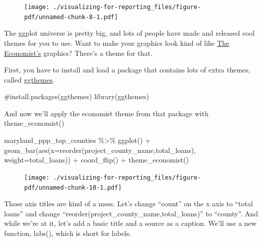 \documentclass[
  letterpaper,
  DIV=11,
  numbers=noendperiod]{scrreprt}
\newenvironment{Shaded}{\begin{snugshade}}{\end{snugshade}}
\newcommand{\AttributeTok}[1]{\textcolor[rgb]{0.40,0.45,0.13}{#1}}
\newcommand{\CommentTok}[1]{\textcolor[rgb]{0.37,0.37,0.37}{#1}}
\newcommand{\FunctionTok}[1]{\textcolor[rgb]{0.28,0.35,0.67}{#1}}
\newcommand{\NormalTok}[1]{\textcolor[rgb]{0.00,0.23,0.31}{#1}}
\newcommand{\SpecialCharTok}[1]{\textcolor[rgb]{0.37,0.37,0.37}{#1}}
\begin{document}
\begin{figure}[H]

{\centering \texttt{[image: ./visualizing-for-reporting\_files/figure-pdf/unnamed-chunk-8-1.pdf]}

}

\end{figure}

The ggplot universe is pretty big, and lots of people have made and
released cool themes for you to use. Want to make your graphics look
kind of like \href{https://www.economist.com/}{The Economist's}
graphics? There's a theme for that.

First, you have to install and load a package that contains lots of
extra themes, called
\href{https://yutannihilation.github.io/allYourFigureAreBelongToUs/ggthemes/}{ggthemes}.

\begin{Shaded}
\begin{Highlighting}[]
\CommentTok{\#install.packages(\textquotesingle{}ggthemes\textquotesingle{})}
\FunctionTok{library}\NormalTok{(ggthemes)}
\end{Highlighting}
\end{Shaded}

And now we'll apply the economist theme from that package with
theme\_economist()

\begin{Shaded}
\begin{Highlighting}[]
\NormalTok{maryland\_ppp\_top\_counties }\SpecialCharTok{\%\textgreater{}\%}
  \FunctionTok{ggplot}\NormalTok{() }\SpecialCharTok{+}
  \FunctionTok{geom\_bar}\NormalTok{(}\FunctionTok{aes}\NormalTok{(}\AttributeTok{x=}\FunctionTok{reorder}\NormalTok{(project\_county\_name,total\_loans), }\AttributeTok{weight=}\NormalTok{total\_loans)) }\SpecialCharTok{+}
  \FunctionTok{coord\_flip}\NormalTok{() }\SpecialCharTok{+} 
  \FunctionTok{theme\_economist}\NormalTok{()}
\end{Highlighting}
\end{Shaded}

\begin{figure}[H]

{\centering \texttt{[image: ./visualizing-for-reporting\_files/figure-pdf/unnamed-chunk-10-1.pdf]}

}

\end{figure}

Those axis titles are kind of a mess. Let's change ``count'' on the x
axis to ``total loans'' and change
``reorder(project\_county\_name,total\_loans)'' to ``county''. And while
we're at it, let's add a basic title and a source as a caption. We'll
use a new function, labs(), which is short for labels.
\end{document}

